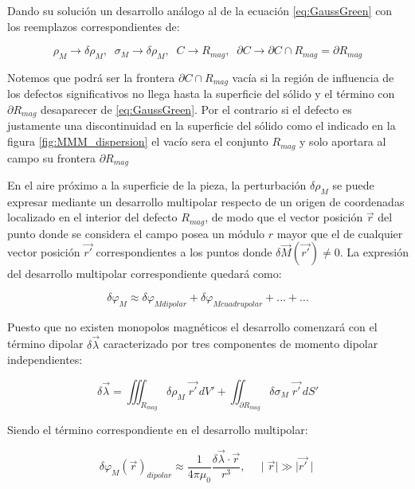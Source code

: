 Dando su solución un desarrollo análogo al de la ecuación \ref{eq:GaussGreen} con los reemplazos correspondientes de:

\begin{equation}
	\label{eq:GaussGreenReemplazos}
	\rho_{M}   \rightarrow \delta\rho_{M},\;\;
	\sigma_{M} \rightarrow \delta\rho_{M},\;\;	  
	C \rightarrow R_{mag}, \;\;	  
	\partial C \rightarrow \partial C \cap R_{mag} = \partial R_{mag}
\end{equation}

Notemos que podrá ser la frontera $\partial C \cap R_{mag}$ vacía si la región de influencia de los defectos significativos no llega hasta la superficie del sólido y el término con $\partial R_{mag}$ desaparecer de \ref{eq:GaussGreen}. Por el contrario si el defecto es justamente una discontinuidad en la superficie del sólido como el indicado en la figura \ref{fig:MMM_dispersion} el vacío sera el conjunto $R_{mag}$ y solo aportara al campo su frontera $\partial R_{mag}$

En el aire próximo a la superficie de la pieza, la perturbación $\delta\rho_{M}$ se puede expresar mediante un desarrollo multipolar respecto de un origen de coordenadas localizado en el interior del defecto $R_{mag}$, de modo que el vector posición $\vec{r}$ del punto donde se considera el campo posea un módulo $r$ mayor que el de cualquier vector posición $\vec{r'}$ correspondientes a los puntos donde $\delta \vec{M}(\vec{r'}) \neq 0$. La expresión del desarrollo multipolar correspondiente quedará como:

\begin{equation}
	\label{eq:DesarrolloMultipolar}
	\delta\varphi_{M} \approx \delta\varphi_{M dipolar} + \delta\varphi_{M cuadrupolar} + . . . + . . . 
\end{equation}

Puesto que no existen monopolos magnéticos el desarrollo comenzará con el término dipolar $\delta\vec{\lambda}$ caracterizado por tres componentes de momento dipolar independientes:

\begin{equation}
	\label{eq:Dipolo}
	\delta\vec{\lambda} = \iiint_{R_{mag}} \delta\rho_{M}\; \vec{r'} \,dV' + 
	\iint_{\partial R_{mag}} \delta\sigma_{M}\;  \vec{r'} \,dS'
\end{equation}

Siendo el término correspondiente en el desarrollo multipolar: 

\begin{equation}
	\label{eq:GaussGreenDipolo}
	\delta\varphi_{M}(\vec{r})_{dipolar} \approx \frac{1}{4\pi\mu_{0}} \frac{\delta\vec{\lambda} \cdot \vec{r}}{r^3}
	, \;\;\;\; \mid \vec{r} \mid \gg \mid \vec{r'} \mid 
\end{equation}



